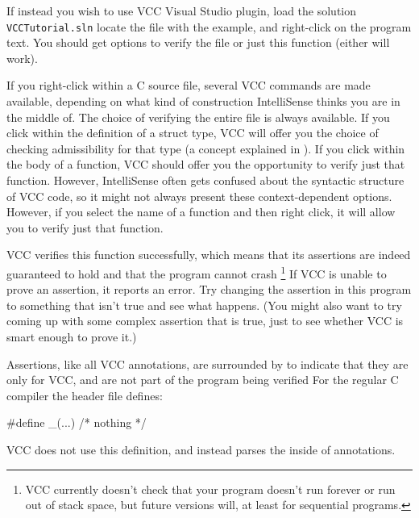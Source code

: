 If instead you wish to use VCC Visual Studio plugin, load the solution \lstinline|VCCTutorial.sln|
locate the file with the example, and right-click on the program text.
You should get options to verify the file or just this function (either will work).

\begin{note}
If you right-click within a C source file,
several VCC commands are made available, depending on what kind of
construction IntelliSense thinks you are in the middle of. The choice
of verifying the entire file is always available. If you click within
the definition of a struct type, VCC will offer you the choice of
checking admissibility for that type (a concept explained in ).
If you click within the body of a function, VCC should offer
you the opportunity to verify just that function. However,
IntelliSense often gets confused about the syntactic structure of
VCC code, so it might not always present these context-dependent
options. However, if you select the name of a function and then right
click, it will allow you to verify just that function.
\end{note}

VCC verifies this function successfully, which means that its
assertions are indeed guaranteed to hold and that the program cannot
crash%
\footnote{
  VCC currently doesn't check that your program doesn't run forever or
  run out of stack space, but future versions will, at least for sequential
  programs.  
}
If VCC is unable
to prove an assertion, it reports an error.  Try changing the
assertion in this program to something that isn't true and see what
happens. (You might also want to try coming up with some complex
assertion that is true, just to see whether VCC is smart enough to
prove it.)

Assertions, like all VCC annotations, 
are surrounded by  to indicate that they are
only for VCC, and are not part of the program being verified
For the regular C compiler the  header file defines:
\begin{VCC}
#define _(...) /* nothing */
\end{VCC}
VCC does not use this definition, and instead parses the inside of 
annotations.%



